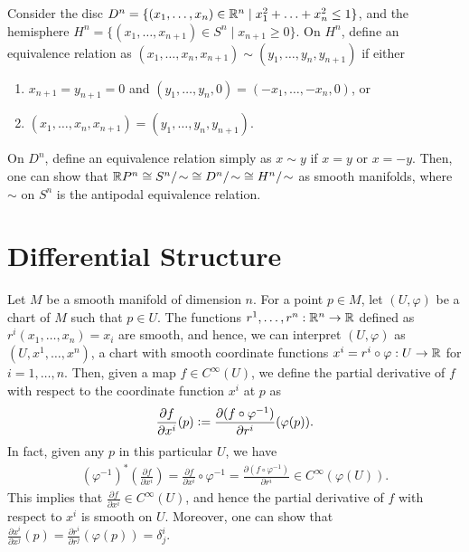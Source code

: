 \begin{example}
    Consider the disc $D^{n} = \{(x_{1},\ldots,x_{n}) \in \mathbb{R}^{n} \mid x_{1}^{2}+\ldots+x_{n}^{2} \leq 1\}$, and the hemisphere $H^{n} = \{(x_{1},\ldots,x_{n+1}) \in S^{n} \mid x_{n+1} \geq 0\}$. On $H^{n}$, define an equivalence relation as $(x_{1},\ldots,x_{n},x_{n+1}) \sim (y_{1},\ldots,y_{n},y_{n+1})$ if either
    \begin{enumerate}
        \item $x_{n+1} = y_{n+1} = 0$ and $(y_{1},\ldots,y_{n},0) = (-x_{1},\ldots,-x_{n},0)$, or
        \item $(x_{1},\ldots,x_{n},x_{n+1}) = (y_{1},\ldots,y_{n},y_{n+1})$.
    \end{enumerate}
    On $D^{n}$, define an equivalence relation simply as $x \sim y$ if $x = y$ or $x = -y$. Then, one can show that $\mathbb{R} P^{n} \cong S^{n}/\!\sim \; \cong D^{n}/\!\sim \; \cong H^{n}/\!\sim$ as smooth manifolds, where $\sim$ on $S^{n}$ is the antipodal equivalence relation.
\end{example}

\section{Differential Structure}
Let $M$ be a smooth manifold of dimension $n$. For a point $p \in M$, let $(U,\varphi)$ be a chart of $M$ such that $p \in U$. The functions $r^{1},\ldots,r^{n}:\mathbb{R}^{n} \to \mathbb{R}$ defined as $r^{i}(x_{1},\ldots,x_{n}) = x_{i}$ are smooth, and hence, we can interpret $(U,\varphi)$ as $(U,x^{1},\ldots,x^{n})$, a chart with smooth coordinate functions $x^{i} = r^{i} \circ \varphi:U \to \mathbb{R}$ for $i = 1,\ldots,n$. Then, given a map $f \in C^{\infty}(U)$, we define the partial derivative of $f$ with respect to the coordinate function $x^{i}$ at $p$ as
\begin{align}
    \frac{\partial f}{\partial x^{i}}(p) \vcentcolon= \frac{\partial (f \circ \varphi^{-1})}{\partial r^{i}}(\varphi(p)).
\end{align}
In fact, given any $p$ in this particular $U$, we have
\begin{align}
    (\varphi^{-1})^{\ast}\left(\frac{\partial f}{\partial x^{i}} \right) = \frac{\partial f}{\partial x^{i}} \circ \varphi^{-1} = \frac{\partial (f \circ \varphi^{-1})}{\partial r^{i}} \in C^{\infty}(\varphi(U)).
\end{align}
This implies that $\frac{\partial f}{\partial x^{i}} \in C^{\infty}(U)$, and hence the partial derivative of $f$ with respect to $x^{i}$ is smooth on $U$. Moreover, one can show that $\frac{\partial x^{i}}{\partial x^{j}}(p) = \frac{\partial r^{i}}{\partial r^{j}}(\varphi(p)) = \delta_{j}^{i}$.

